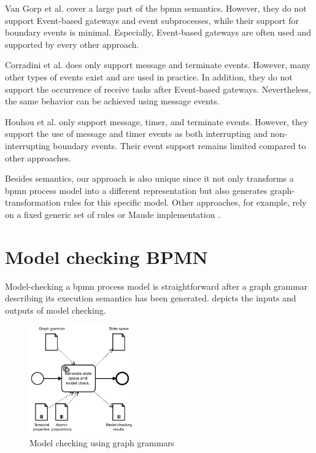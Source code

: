 \documentclass[adraft, copyright, creativecommons]{eptcs} %
\begin{document}
Van Gorp et al. \cite{vangorpVisualTokenbasedFormalization2013} cover a large part of the \gls*{bpmn} semantics.
However, they do not support Event-based gateways and event subprocesses, while their support for boundary events is minimal.
Especially, Event-based gateways are often used and supported by every other approach.

Corradini et al. \cite{corradiniFormalApproachAnalysis2021} does only support message and terminate events.
However, many other types of events exist and are used in practice.
In addition, they do not support the occurrence of receive tasks after Event-based gateways.
Nevertheless, the same behavior can be achieved using message events.

Houhou et al. only support message, timer, and terminate events.
However, they support the use of message and timer events as both interrupting and non-interrupting boundary events.
Their event support remains limited compared to other approaches.




Besides semantics, our approach is also unique since it not only transforms a \gls*{bpmn} process model into a different representation but also generates graph-transformation rules for this specific model.
Other approaches, for example, rely on a fixed generic set of rules \cite{vangorpVisualTokenbasedFormalization2013} or Maude implementation \cite{corradiniFormalApproachAnalysis2021}.
\section{Model checking BPMN}
Model-checking a \gls*{bpmn} process model is straightforward after a graph grammar describing its execution semantics has been generated.
 depicts the inputs and outputs of model checking.

\begin{figure}[h]
    \centering
    \includegraphics[width=0.4\textwidth]{images/approach-second-part.pdf}
    \caption{Model checking using graph grammars}
    \label{fig:modelChecking}
\end{figure}
\end{document}
